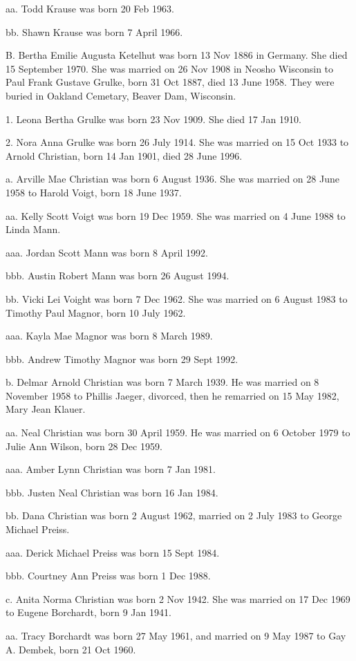 \documentclass[a4paper]{article}
\begin{document}
aa. Todd Krause was born 20 Feb 1963.

bb. Shawn Krause was born 7 April 1966.

B. Bertha Emilie Augusta Ketelhut was born 13 Nov 1886 in Germany.  She died 15 September 1970.  She was married on 26 Nov 1908 in Neosho Wisconsin to Paul Frank Gustave Grulke, born 31 Oct 1887, died 13 June 1958.  They were buried in Oakland Cemetary, Beaver Dam, Wisconsin.

1. Leona Bertha Grulke was born 23 Nov 1909.  She died 17 Jan 1910.

2. Nora Anna Grulke was born 26 July 1914.  She was married on 15 Oct 1933 to Arnold Christian, born 14 Jan 1901, died 28 June 1996.

a. Arville Mae Christian was born 6 August 1936.  She was married on 28 June 1958 to Harold Voigt, born 18 June 1937.

aa. Kelly Scott Voigt  was born 19 Dec 1959.  She was married on 4 June 1988 to Linda Mann.

aaa. Jordan Scott Mann was born 8 April 1992.

bbb. Austin Robert Mann was born 26 August 1994.
				
bb. Vicki Lei Voight was born 7 Dec 1962.  She was married on 6 August 1983 to Timothy Paul Magnor, born 10 July 1962.

aaa. Kayla Mae Magnor was born 8 March 1989.

bbb. Andrew Timothy Magnor was born 29 Sept 1992.

b. Delmar Arnold Christian was born 7 March 1939.  He was married on 8 November 1958 to Phillis Jaeger, divorced, then he remarried on 15 May 1982, Mary Jean Klauer.

aa. Neal Christian was born 30 April 1959.  He was married on 6 October 1979 to Julie Ann Wilson, born 28 Dec 1959.

aaa. Amber Lynn Christian was born 7 Jan 1981.

bbb. Justen Neal Christian was born 16 Jan 1984.

bb. Dana Christian was born 2 August 1962, married on 2 July 1983 to George Michael Preiss.

aaa. Derick Michael Preiss was born 15 Sept 1984.

bbb. Courtney Ann Preiss was born 1 Dec 1988.

c. Anita Norma Christian was born 2 Nov 1942.  She was married on 17 Dec 1969 to Eugene Borchardt, born 9 Jan 1941. 

aa. Tracy Borchardt was born 27 May 1961,  and married on 9 May 1987 to Gay A. Dembek, born 21 Oct 1960.
\end{document}

